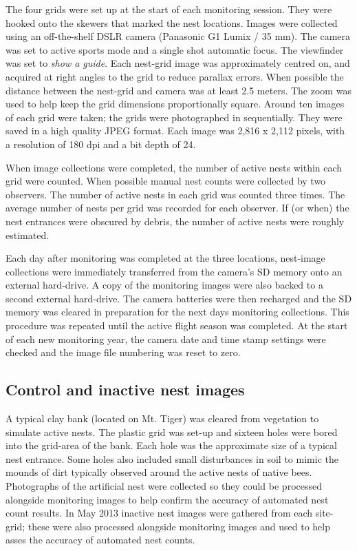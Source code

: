 The four grids were set up at the start of each monitoring session. They were hooked onto the skewers that marked the nest locations. Images were collected using an off-the-shelf   \ac{DSLR} camera (Panasonic G1 Lumix / 35 mm). The camera was set to active sports mode and a single shot automatic focus. The viewfinder was set to \emph{show a guide}. Each nest-grid image was approximately centred on, and acquired at right angles to the grid to reduce parallax errors. When possible the distance between the nest-grid and camera was at least 2.5 meters. The zoom was used to help keep the grid dimensions proportionally square. Around ten images of each grid were taken; the grids were photographed in sequentially. They were saved in a high quality \ac{JPEG} format. Each image was 2,816 x 2,112 pixels, with a resolution of 180 \ac{dpi} and a bit depth of 24. 

When image collections were completed, the number of active nests within each grid were counted. When possible manual nest counts were collected by two observers. The number of active nests in each grid was counted three times. The average number of nests per grid was recorded for each observer. If (or when) the nest entrances were obscured by debris, the number of active nests were roughly estimated.

Each day after monitoring was completed at the three locations, nest-image collections were immediately transferred from the camera's \ac{SD} memory onto an external hard-drive. A copy of the monitoring images were also backed to a second external hard-drive. The camera batteries were then recharged and the \ac{SD} memory was cleared in preparation for the next days monitoring collections. This procedure was repeated until the active flight season was completed. At the start of each new monitoring year, the camera date and time stamp settings were checked and the image file numbering was reset to zero.


\subsection{Control and inactive nest images}\label{sec:control-and-inactive-nest-images}
A typical clay bank (located on Mt. Tiger) was cleared from vegetation to simulate active nests. The plastic grid was set-up and sixteen holes were bored into the grid-area of the bank. Each hole was the approximate size of a typical nest entrance. Some holes also included small disturbances in soil to mimic the mounds of dirt typically observed around the active nests of native bees. Photographs of the artificial nest were collected so they could be processed alongside monitoring images to help confirm the accuracy of automated nest count results. In May 2013 inactive nest images were gathered from each site-grid; these were also processed alongside monitoring images and used to help asses the accuracy of automated nest counts.

